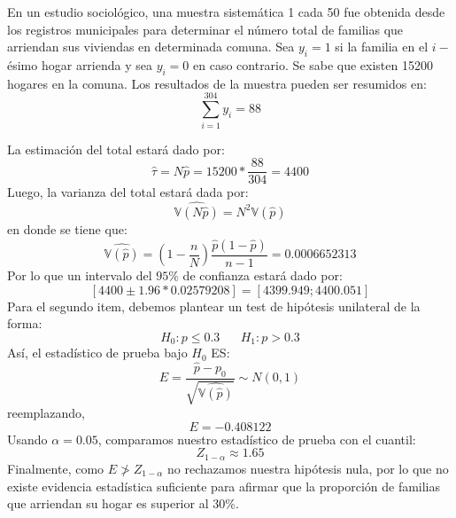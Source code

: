 \addpoints
\question[25] En un estudio sociológico, una muestra sistemática 1 cada 50 fue obtenida desde los registros municipales para determinar el número total de familias que arriendan sus viviendas en determinada comuna. Sea $y_i=1$ si la familia en el $i-$ésimo hogar arrienda y sea $y_i=0$ en caso contrario. Se sabe que existen 15200 hogares en la comuna. Los resultados de la muestra pueden ser resumidos en:
$$\sum_{i=1}^{304} y_i=88$$
\noaddpoints
{}
\begin{solution}
La estimación del total estará dado por:
$$\hat{\tau}=N\hat{p}=15200*\dfrac{88}{304}=4400$$
Luego, la varianza del total estará dada por:
$$\widehat{\mathbb{V}(N\widehat{p})}=N^2\mathbb{V}(\widehat{p})$$
en donde se tiene que:
$$\widehat{\mathbb{V}(\widehat{p})}=\left(1-\dfrac{n}{N}\right)\dfrac{\widehat{p}(1-\widehat{p})}{n-1}=0.0006652313$$
Por lo que un intervalo del $95\%$ de confianza estará dado por:
$$[4400 \pm 1.96 * 0.02579208]=[4399.949;4400.051]$$ 
Para el segundo item, debemos plantear un test de hipótesis unilateral de la forma:
$$H_0: p \leq 0.3 \hspace{20pt} H_1: p> 0.3$$
Así, el estadístico de prueba bajo $H_0$ ES:
$$E=\dfrac{\widehat{p}-p_0}{\sqrt{\widehat{\mathbb{V}(\widehat{p})}}}\sim N(0,1)$$
reemplazando,
$$E=-0.408122$$
Usando $\alpha=0.05$, comparamos nuestro estadístico de prueba con el cuantil:
$$Z_{1-\alpha}\approx 1.65$$
Finalmente, como $E \ngtr Z_{1-\alpha}$ no rechazamos nuestra hipótesis nula, por lo que no existe evidencia estadística suficiente para afirmar que la proporción de familias que arriendan su hogar es superior al $30\%$.
\end{solution}